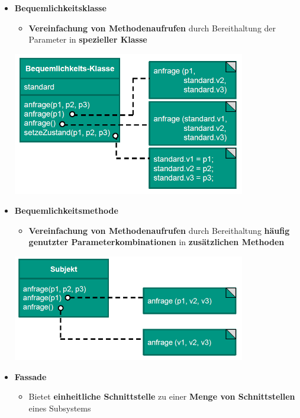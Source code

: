 			\begin{itemize}
				\item \textbf{Bequemlichkeitsklasse}
				\begin{itemize}
					\item \textbf{Vereinfachung von Methodenaufrufen} durch Bereithaltung der Parameter in \textbf{spezieller Klasse}
				\end{itemize}
				\begin{center}
					\includegraphics[width=0.8\textwidth]{../images/bequemlichkeitsklasse.png}
				\end{center}
				\item \textbf{Bequemlichkeitsmethode}
				\begin{itemize}
					\item \textbf{Vereinfachung von Methodenaufrufen} durch Bereithaltung \textbf{häufig genutzter Parameterkombinationen} in \textbf{zusätzlichen Methoden}
				\end{itemize}
				\begin{center}
					\includegraphics[width=0.8\textwidth]{../images/bequemlichkeitsmethode.png}
				\end{center}
				\newpage
				\item \textbf{Fassade}
				\begin{itemize}
					\item Bietet \textbf{einheitliche Schnittstelle} zu einer \textbf{Menge von Schnittstellen} eines Subsystems

\end{itemize}
\end{itemize}
